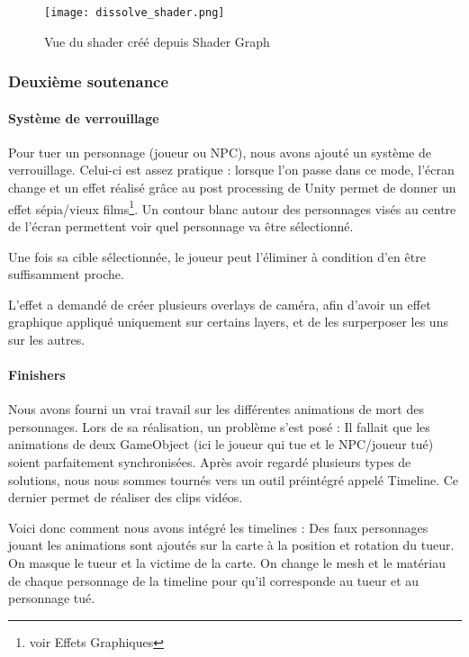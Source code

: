             \begin{figure}[hbt!]
                \centering
                \texttt{[image: dissolve\_shader.png]}
                \caption{Vue du shader créé depuis Shader Graph}
            \end{figure}



	\subsubsection{Deuxième soutenance}

		\paragraph{Système de verrouillage}

			Pour tuer un personnage (joueur ou NPC),
			nous avons ajouté un système de verrouillage. Celui-ci est assez pratique : lorsque l'on passe dans ce mode, l'écran change et 
			un effet réalisé grâce au post processing de Unity permet de donner un effet sépia/vieux films\footnote{voir Effets Graphiques}.
			Un contour blanc autour des personnages visés au centre de l'écran permettent voir quel personnage va être sélectionné.

			Une fois sa cible sélectionnée, le joueur peut l'éliminer à condition d'en être suffisamment proche.

			L'effet a demandé de créer plusieurs overlays de caméra, afin d'avoir un effet graphique
			appliqué uniquement sur certains layers, et de les surperposer les uns sur les autres. 

		\paragraph{Finishers}
			Nous avons fourni un vrai travail sur les différentes animations de mort des personnages.
			Lors de sa réalisation, un problème s'est posé : Il fallait que les animations de deux GameObject (ici le joueur qui tue et le NPC/joueur tué) 
			soient parfaitement synchronisées. Après avoir regardé plusieurs types de solutions, nous nous sommes tournés vers un outil préintégré appelé Timeline.
			Ce dernier permet de réaliser des clips vidéos.

			Voici donc comment nous avons intégré les timelines :
			\newline
			Des faux personnages jouant les animations sont ajoutés sur la carte à la position et rotation du tueur.
			On masque le tueur et la victime de la carte.
			On change le mesh et le matériau de chaque personnage de la timeline pour qu'il corresponde au tueur et au
			personnage tué.

